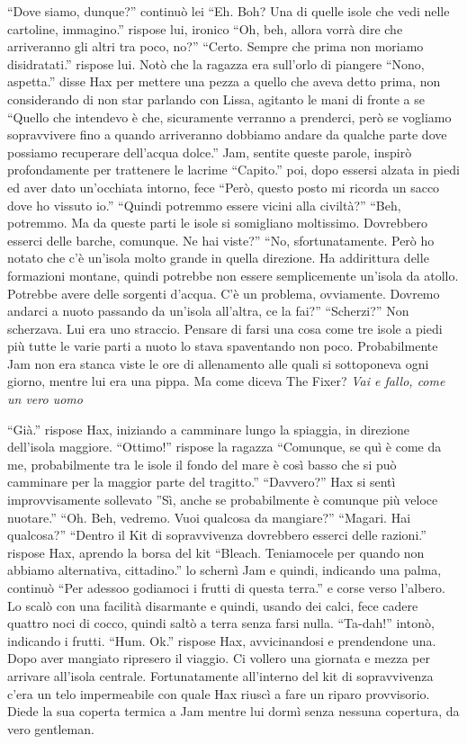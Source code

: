     ``Dove siamo, dunque?'' continuò lei ``Eh. Boh? Una di quelle isole che
    vedi nelle cartoline, immagino.'' rispose lui, ironico ``Oh, beh,
    allora vorrà dire che arriveranno gli altri tra poco, no?'' ``Certo.
    Sempre che prima non moriamo disidratati.'' rispose lui. Notò che la
    ragazza era sull'orlo di piangere ``Nono, aspetta.'' disse Hax per
    mettere una pezza a quello che aveva detto prima, non considerando di
    non star parlando con Lissa, agitanto le mani di fronte a se ``Quello
    che intendevo è che, sicuramente verranno a prenderci, però se vogliamo
    sopravvivere fino a quando arriveranno dobbiamo andare da qualche parte
    dove possiamo recuperare dell'acqua dolce.'' Jam, sentite queste
    parole, inspirò profondamente per trattenere le lacrime ``Capito.''
    poi, dopo essersi alzata in piedi ed aver dato un'occhiata intorno,
    fece ``Però, questo posto mi ricorda un sacco dove ho vissuto io.''
    ``Quindi potremmo essere vicini alla civiltà?'' ``Beh, potremmo. Ma da
    queste parti le isole si somigliano moltissimo. Dovrebbero esserci
    delle barche, comunque. Ne hai viste?'' ``No, sfortunatamente. Però ho
    notato che c'è un'isola molto grande in quella direzione. Ha
    addirittura delle formazioni montane, quindi potrebbe non essere
    semplicemente un'isola da atollo. Potrebbe avere delle sorgenti
    d'acqua. C'è un problema, ovviamente. Dovremo andarci a nuoto passando
    da un'isola all'altra, ce la fai?'' ``Scherzi?'' Non scherzava. Lui era
    uno straccio. Pensare di farsi una cosa come tre isole a piedi più
    tutte le varie parti a nuoto lo stava spaventando non poco.
    Probabilmente Jam non era stanca viste le ore di allenamento alle quali
    si sottoponeva ogni giorno, mentre lui era una pippa. Ma come
    diceva The Fixer? \emph{Vai e fallo, come un vero uomo}

    ``Già.'' rispose Hax, iniziando a camminare lungo la spiaggia, in
    direzione dell'isola maggiore. ``Ottimo!'' rispose la ragazza
    ``Comunque, se quì è come da me, probabilmente tra le isole il fondo
    del mare è così basso che si può camminare per la maggior parte del
    tragitto.'' ``Davvero?'' Hax si sentì improvvisamente sollevato ''Sì,
    anche se probabilmente è comunque più veloce nuotare.'' ``Oh. Beh,
    vedremo. Vuoi qualcosa da mangiare?'' ``Magari. Hai qualcosa?''
    ``Dentro il Kit di sopravvivenza dovrebbero esserci delle razioni.''
    rispose Hax, aprendo la borsa del kit ``Bleach. Teniamocele per quando
    non abbiamo alternativa, cittadino.'' lo schernì Jam e quindi,
    indicando una palma, continuò ``Per adessoo godiamoci i frutti di
    questa terra.'' e corse verso l'albero. Lo scalò con una facilità
    disarmante e quindi, usando dei calci, fece cadere quattro noci di
    cocco, quindi saltò a terra senza farsi nulla. ``Ta-dah!'' intonò,
    indicando i frutti. ``Hum. Ok.'' rispose Hax, avvicinandosi e
    prendendone una. Dopo aver mangiato ripresero il viaggio. Ci vollero
    una giornata e mezza per arrivare all'isola centrale. Fortunatamente
    all'interno del kit di sopravvivenza c'era un telo impermeabile con
    quale Hax riuscì a fare un riparo provvisorio. Diede la sua coperta
    termica a Jam mentre lui dormì senza nessuna copertura, da vero
    gentleman.

